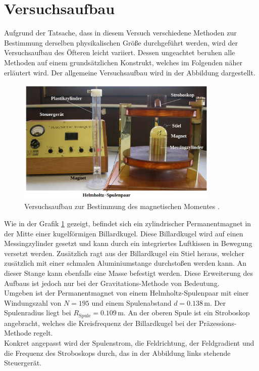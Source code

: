 


\section{Versuchsaufbau}

\noindent Aufgrund der Tatsache, dass in diesem Versuch verschiedene Methoden zur Bestimmung derselben physikalischen Größe 
durchgeführt werden, wird der Versuchsaufbau des Öfteren leicht variiert. Dessen ungeachtet beruhen alle Methoden auf 
einem grundsätzlichen Konstrukt, welches im Folgenden näher erläutert wird. Der allgemeine Versuchsaufbau wird in der 
Abbildung dargestellt.

\begin{figure}[H]
    \centering
    \includegraphics[height=6cm]{aufbau.png}
    \caption{Versuchsaufbau zur Bestimmung des magnetischen Momentes \cite{Versuchsanleitung_v105}.}
    \label{fig:aufbau_moment}
\end{figure}

\noindent Wie in der Grafik \ref{fig:aufbau_moment} gezeigt, befindet sich ein zylindrischer Permanentmagnet in der Mitte einer 
kugelförmigen Billardkugel. Diese Billardkugel wird auf einen Messingzylinder gesetzt und kann durch ein integriertes Luftkissen
in Bewegung versetzt werden. Zusätzlich ragt aus der Billardkugel ein Stiel heraus, welcher zusätzlich mit einer schmalen 
Aluminiumstange durchstoßen werden kann. An dieser Stange kann ebenfalls eine Masse befestigt werden. Diese Erweiterung des 
Aufbaus ist jedoch nur bei der Gravitations-Methode von Bedeutung.\\
Umgeben ist der Permanentmagnet von einem Helmholtz-Spulenpaar mit einer Windungszahl von $N = 195$ und einem Spulenabstand 
$d = 0.138\,\unit{\meter}$. Der Spulenradius liegt bei $R_\text{Spule} = 0.109\,\unit{\meter}$. An der oberen Spule ist 
ein Stroboskop angebracht, welches die Kreisfrequenz der Billardkugel bei der Präzessions-Methode regelt.\\
Konkret angepasst wird der Spulenstrom, die Feldrichtung, der Feldgradient und die Frequenz des Stroboskops durch, das in der 
Abbildung links stehende Steuergerät.


